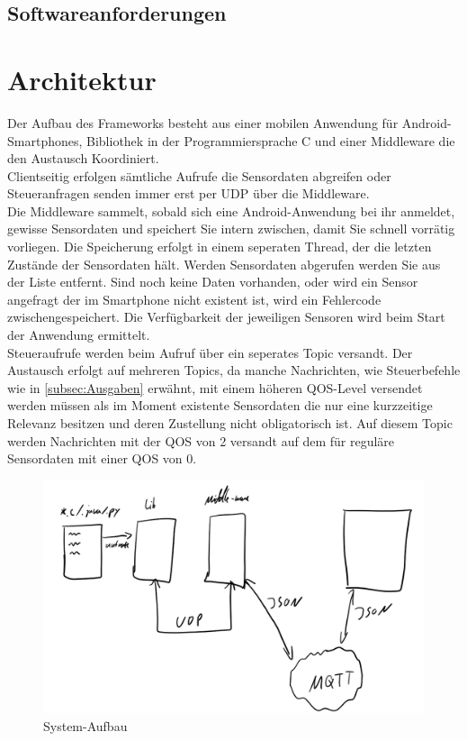 \documentclass[11pt,a4paper]{report}
\begin{document}
\section*{Softwareanforderungen}\label{sec:anforderungen}

\chapter{Architektur} \label{chap:architektur}
Der Aufbau des Frameworks besteht aus einer mobilen Anwendung für Android-Smartphones, Bibliothek in der Programmiersprache C und einer Middleware die den Austausch Koordiniert.
\\
Clientseitig erfolgen sämtliche Aufrufe die Sensordaten abgreifen oder Steueranfragen senden immer erst per UDP über die Middleware.
\\
Die Middleware sammelt, sobald sich eine Android-Anwendung bei ihr anmeldet, gewisse Sensordaten und speichert Sie intern zwischen, damit Sie schnell vorrätig vorliegen.
Die Speicherung erfolgt in einem seperaten Thread, der die letzten Zustände der Sensordaten hält.
Werden Sensordaten abgerufen werden Sie aus der Liste entfernt.
Sind noch keine Daten vorhanden, oder wird ein Sensor angefragt der im Smartphone nicht existent ist, wird ein Fehlercode zwischengespeichert.
Die Verfügbarkeit der jeweiligen Sensoren wird beim Start der Anwendung ermittelt.
\\
Steueraufrufe werden beim Aufruf über ein seperates Topic versandt.
Der Austausch erfolgt auf mehreren Topics, da manche Nachrichten, wie Steuerbefehle wie in \ref{subsec:Ausgaben} erwähnt, mit einem höheren QOS-Level versendet werden müssen als im Moment existente Sensordaten die nur eine kurzzeitige Relevanz besitzen und deren Zustellung nicht obligatorisch ist.
Auf diesem Topic werden Nachrichten mit der QOS von 2 versandt auf dem für reguläre Sensordaten mit einer QOS von 0.
\begin{figure}[htbp]
  \centering
  \includegraphics[width=.9\textwidth]{images/design.png}
  \caption{System-Aufbau}
  \label{fig:design}
\end{figure}
\end{document}
